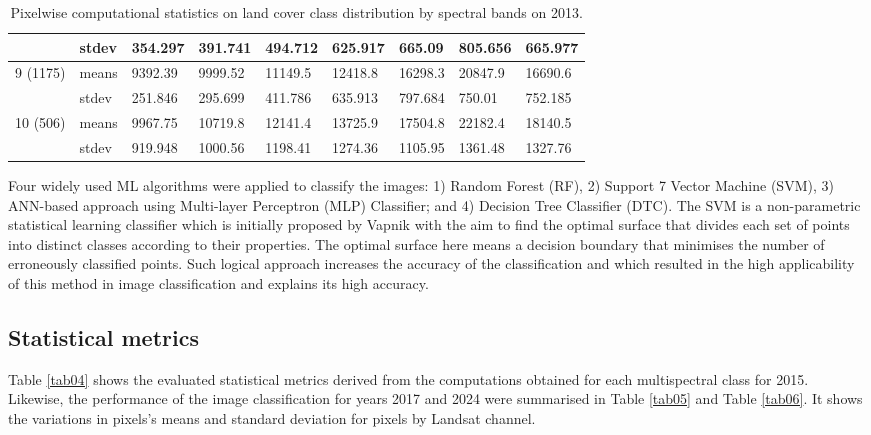 \documentclass[jmse,article,submit,pdftex,moreauthors]{Definitions/mdpi}
\begin{document}
\begin{table}[H]
\begin{tabularx}{\linewidth}{p{1.3cm}p{1.0cm}p{1.0cm}p{1.0cm}p{1.0cm}p{1.0cm}p{1.0cm}p{1.0cm}p{1.0cm}}
    & stdev & 354.297 & 391.741 & 494.712 & 625.917 & 665.09 & 805.656 & 665.977 \\
    \midrule
    \multirow{2}{*}{9 (1175)} & means & 9392.39 & 9999.52 & 11149.5 & 12418.8 & 16298.3 & 20847.9 & 16690.6 \\
    & stdev & 251.846 & 295.699 & 411.786 & 635.913 & 797.684 & 750.01 & 752.185 \\
    \midrule
  \multirow{2}{*}{10 (506)} & means & 9967.75 & 10719.8 & 12141.4 & 13725.9 & 17504.8 & 22182.4 & 18140.5 \\
   & stdev & 919.948 & 1000.56 & 1198.41 & 1274.36 & 1105.95 & 1361.48 & 1327.76 \\
\bottomrule
\end{tabularx}
  \caption{Pixelwise computational statistics on land cover class distribution by spectral bands on 2013.}
  \label{tab03}
\end{table}

Four widely used ML algorithms were applied to classify the images:  1) Random Forest (RF), 2) Support 7 Vector Machine (SVM), 3) ANN-based approach using Multi-layer Perceptron (MLP) Classifier; and 4) Decision Tree Classifier (DTC). The SVM is a non-parametric statistical learning classifier which is initially proposed by Vapnik \cite{788640} with the aim to find the optimal surface that divides each set of points into distinct classes according to their properties. The optimal surface here means a decision boundary that minimises the number of erroneously classified points. Such logical approach increases the accuracy of the classification and which resulted in the high applicability of this method in image classification and explains its high accuracy.

\subsection{Statistical metrics}
Table \ref{tab04} shows the evaluated statistical metrics derived from the computations obtained for each multispectral class for 2015. Likewise, the performance of the image classification for years 2017 and 2024 were summarised in Table \ref{tab05} and Table \ref{tab06}. It shows the variations in pixels's means and standard deviation for pixels by Landsat channel. 
\end{document}
